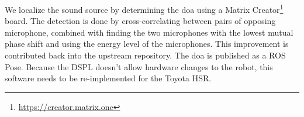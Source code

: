 We localize the sound source by determining the \acrfull{doa} using a Matrix Creator\footnote{\url{https://creator.matrix.one}} board.
The detection is done by cross-correlating between pairs of opposing microphone, combined with finding the two microphones with the lowest mutual phase shift and using the energy level of the microphones.
This improvement is contributed back into the upstream repository.
The \acrshort{doa} is published as a ROS Pose. Because the DSPL doesn't allow hardware changes to the robot, this software needs to be re-implemented for the Toyota HSR.

